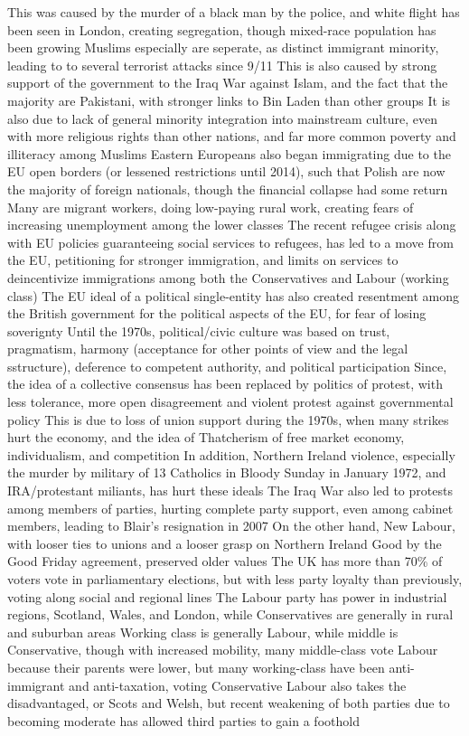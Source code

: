 \documentclass[11 pt, twoside]{article}
\newenvironment{outline*}
{
	\begin{outline}[enumerate]
	}
	{\end{outline}
}
\begin{document}
\begin{outline*}
\3 This was caused by the murder of a black man by the police, and white flight has been seen in London, creating segregation, though mixed-race population has been growing
\2 Muslims especially are seperate, as distinct immigrant minority, leading to to several terrorist attacks since 9/11
\3 This is also caused by strong support of the government to the Iraq War against Islam, and the fact that the majority are Pakistani, with stronger links to Bin Laden than other groups
\3 It is also due to lack of general minority integration into mainstream culture, even with more religious rights than other nations, and far more common poverty and illiteracy among Muslims
\2 Eastern Europeans also began immigrating due to the EU open borders (or lessened restrictions until 2014), such that Polish are now the majority of foreign nationals, though the financial collapse had some return
\3 Many are migrant workers, doing low-paying rural work, creating fears of increasing unemployment among the lower classes
\3 The recent refugee crisis along with EU policies guaranteeing social services to refugees, has led to a move from the EU, petitioning for stronger immigration, and limits on services to deincentivize immigrations among both the Conservatives and Labour (working class)
\3 The EU ideal of a political single-entity has also created resentment among the British government for the political aspects of the EU, for fear of losing soverignty
\1 Until the 1970s, political/civic culture was based on trust, pragmatism, harmony (acceptance for other points of view and the legal sstructure), deference to competent authority, and political participation
\2 Since, the idea of a collective consensus has been replaced by politics of protest, with less tolerance, more open disagreement and violent protest against governmental policy
\2 This is due to loss of union support during the 1970s, when many strikes hurt the economy, and the idea of Thatcherism of free market economy, individualism, and competition 
\3 In addition, Northern Ireland violence, especially the murder by military of 13 Catholics in Bloody Sunday in January 1972, and IRA/protestant miliants, has hurt these ideals
\3 The Iraq War also led to protests among members of parties, hurting complete party support, even among cabinet members, leading to Blair's resignation in 2007
\2 On the other hand, New Labour, with looser ties to unions and a looser grasp on Northern Ireland Good by the Good Friday agreement, preserved older values
\1 The UK has more than 70\% of voters vote in parliamentary elections, but with less party loyalty than previously, voting along social and regional lines
\2 The Labour party has power in industrial regions, Scotland, Wales, and London, while Conservatives are generally in rural and suburban areas
\2 Working class is generally Labour, while middle is Conservative, though with increased mobility, many middle-class vote Labour because their parents were lower, but many working-class have been anti-immigrant and anti-taxation, voting Conservative
\2 Labour also takes the disadvantaged, or Scots and Welsh, but recent weakening of both parties due to becoming moderate has allowed third parties to gain a foothold
\end{outline*}
\end{document}
